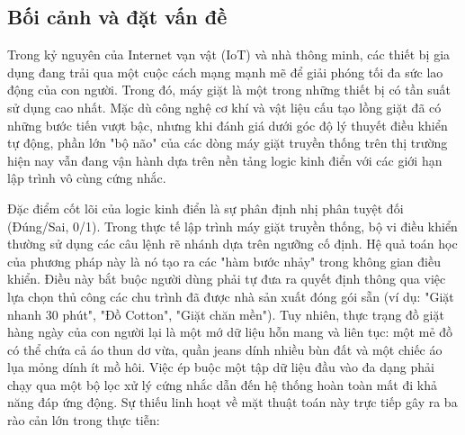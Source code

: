 \documentclass[12pt, a4paper]{article}
\begin{document}
\subsection{Bối cảnh và đặt vấn đề}
Trong kỷ nguyên của Internet vạn vật (IoT) và nhà thông minh, các thiết bị gia dụng đang trải qua một cuộc cách mạng mạnh mẽ để giải phóng tối đa sức lao động của con người. Trong đó, máy giặt là một trong những thiết bị có tần suất sử dụng cao nhất. Mặc dù công nghệ cơ khí và vật liệu cấu tạo lồng giặt đã có những bước tiến vượt bậc, nhưng khi đánh giá dưới góc độ lý thuyết điều khiển tự động, phần lớn "bộ não" của các dòng máy giặt truyền thống trên thị trường hiện nay vẫn đang vận hành dựa trên nền tảng logic kinh điển với các giới hạn lập trình vô cùng cứng nhắc.

Đặc điểm cốt lõi của logic kinh điển là sự phân định nhị phân tuyệt đối (Đúng/Sai, 0/1). Trong thực tế lập trình máy giặt truyền thống, bộ vi điều khiển thường sử dụng các câu lệnh rẽ nhánh dựa trên ngưỡng cố định. Hệ quả toán học của phương pháp này là nó tạo ra các "hàm bước nhảy" trong không gian điều khiển. Điều này bắt buộc người dùng phải tự đưa ra quyết định thông qua việc lựa chọn thủ công các chu trình đã được nhà sản xuất đóng gói sẵn (ví dụ: "Giặt nhanh 30 phút", "Đồ Cotton", "Giặt chăn mền"). Tuy nhiên, thực trạng đồ giặt hàng ngày của con người lại là một mớ dữ liệu hỗn mang và liên tục: một mẻ đồ có thể chứa cả áo thun dơ vừa, quần jeans dính nhiều bùn đất và một chiếc áo lụa mỏng dính ít mồ hôi. Việc ép buộc một tập dữ liệu đầu vào đa dạng phải chạy qua một bộ lọc xử lý cứng nhắc dẫn đến hệ thống hoàn toàn mất đi khả năng đáp ứng động. Sự thiếu linh hoạt về mặt thuật toán này trực tiếp gây ra ba rào cản lớn trong thực tiễn:
\end{document}
